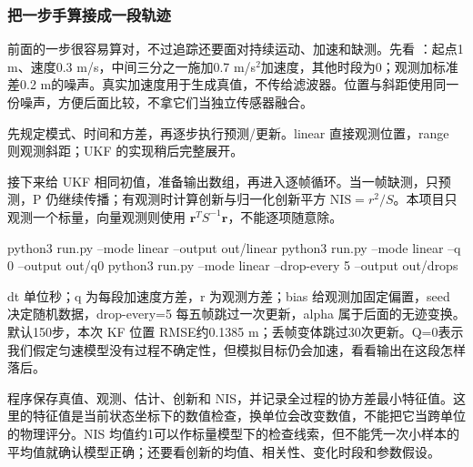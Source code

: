 \subsubsection{把一步手算接成一段轨迹}
前面的一步很容易算对，不过追踪还要面对持续运动、加速和缺测。先看 ：起点1 m、速度0.3 m/s，中间三分之一施加0.7 m/s$^2$加速度，其他时段为0；观测加标准差0.2 m的噪声。真实加速度用于生成真值，不传给滤波器。位置与斜距使用同一份噪声，方便后面比较，不拿它们当独立传感器融合。
\begin{example}[同一输入同时跑两种估计]

 先规定模式、时间和方差，再逐步执行预测/更新。linear 直接观测位置，range 则观测斜距；UKF 的实现稍后完整展开。

接下来给 UKF 相同初值，准备输出数组，再进入逐帧循环。当一帧缺测，只预测，P 仍继续传播；有观测时计算创新与归一化创新平方 $\mathrm{NIS}=r^2/S$。本项目只观测一个标量，向量观测则使用 $\boldsymbol r^TS^{-1}\boldsymbol r$，不能逐项随意除。

\begin{tbash}
python3 run.py --mode linear --output out/linear
python3 run.py --mode linear --q 0 --output out/q0
python3 run.py --mode linear --drop-every 5 --output out/drops
\end{tbash}
dt 单位秒；q 为每段加速度方差，r 为观测方差；bias 给观测加固定偏置，seed 决定随机数据，drop-every=5 每五帧跳过一次更新，alpha 属于后面的无迹变换。默认150步，本次 KF 位置 RMSE约0.1385 m；丢帧变体跳过30次更新。Q=0表示我们假定匀速模型没有过程不确定性，但模拟目标仍会加速，看看输出在这段怎样落后。

程序保存真值、观测、估计、创新和 NIS，并记录全过程的协方差最小特征值。这里的特征值是当前状态坐标下的数值检查，换单位会改变数值，不能把它当跨单位的物理评分。NIS 均值约1可以作标量模型下的检查线索，但不能凭一次小样本的平均值就确认模型正确；还要看创新的均值、相关性、变化时段和参数假设。
\end{example}

